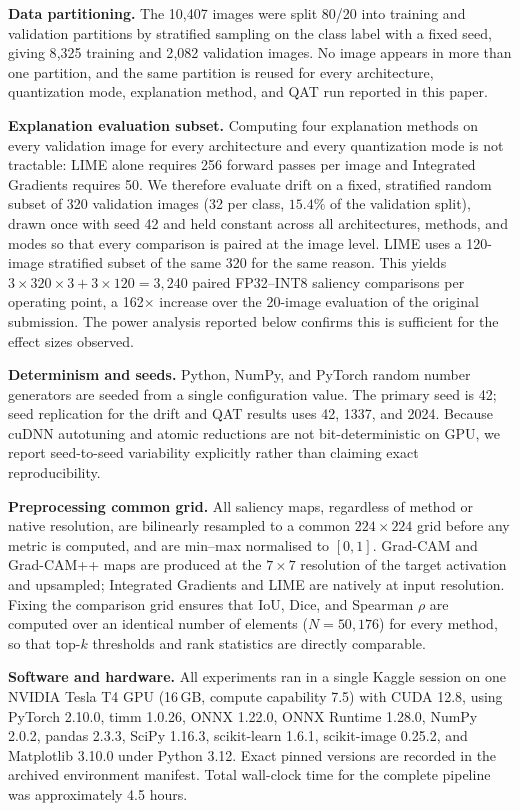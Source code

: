\documentclass[fleqn,10pt]{wlscirep}
\begin{document}
\textbf{Data partitioning.} The 10{,}407 images were split 80/20 into training and validation partitions by stratified sampling on the class label with a fixed seed, giving 8{,}325 training and 2{,}082 validation images. No image appears in more than one partition, and the same partition is reused for every architecture, quantization mode, explanation method, and QAT run reported in this paper.

\textbf{Explanation evaluation subset.} Computing four explanation methods on every validation image for every architecture and every quantization mode is not tractable: LIME alone requires 256 forward passes per image and Integrated Gradients requires 50. We therefore evaluate drift on a fixed, stratified random subset of 320 validation images (32 per class, $15.4\%$ of the validation split), drawn once with seed 42 and held constant across all architectures, methods, and modes so that every comparison is paired at the image level. LIME uses a 120-image stratified subset of the same 320 for the same reason. This yields $3 \times 320 \times 3 + 3 \times 120 = 3{,}240$ paired FP32--INT8 saliency comparisons per operating point, a 162$\times$ increase over the 20-image evaluation of the original submission. The power analysis reported below confirms this is sufficient for the effect sizes observed.

\textbf{Determinism and seeds.} Python, NumPy, and PyTorch random number generators are seeded from a single configuration value. The primary seed is 42; seed replication for the drift and QAT results uses 42, 1337, and 2024. Because cuDNN autotuning and atomic reductions are not bit-deterministic on GPU, we report seed-to-seed variability explicitly rather than claiming exact reproducibility.

\textbf{Preprocessing common grid.} All saliency maps, regardless of method or native resolution, are bilinearly resampled to a common $224 \times 224$ grid before any metric is computed, and are min--max normalised to $[0,1]$. Grad-CAM and Grad-CAM++ maps are produced at the $7 \times 7$ resolution of the target activation and upsampled; Integrated Gradients and LIME are natively at input resolution. Fixing the comparison grid ensures that IoU, Dice, and Spearman $\rho$ are computed over an identical number of elements ($N = 50{,}176$) for every method, so that top-$k$ thresholds and rank statistics are directly comparable.

\textbf{Software and hardware.} All experiments ran in a single Kaggle session on one NVIDIA Tesla T4 GPU (16\,GB, compute capability 7.5) with CUDA 12.8, using PyTorch 2.10.0, timm 1.0.26, ONNX 1.22.0, ONNX Runtime 1.28.0, NumPy 2.0.2, pandas 2.3.3, SciPy 1.16.3, scikit-learn 1.6.1, scikit-image 0.25.2, and Matplotlib 3.10.0 under Python 3.12. Exact pinned versions are recorded in the archived environment manifest. Total wall-clock time for the complete pipeline was approximately 4.5 hours.
\end{document}
